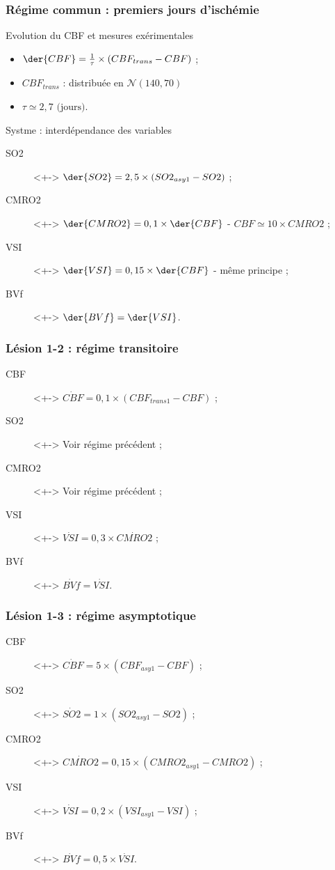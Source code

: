 \begin{frame}
\frametitle{R\'egime commun : premiers jours d'isch\'emie}
\begin{block}{Evolution du CBF et mesures ex\'erimentales}
\begin{itemize}
\item<+-> $\der{CBF}=\frac{1}{\tau}\times \left(CBF_{trans}-CBF\right)$ ;
\item<+-> $CBF_{trans}$ : distribu\'ee en $\mathcal{N}(140,70)$
\item<+-> $\tau \simeq 2,7 \text{ (jours)}$.
\end{itemize}
\end{block}

\begin{block}{Systme : interd\'ependance des variables}
\begin{description}
\item[SO2]<+-> $\der{SO2}=2,5\times (SO2_{asy1}-SO2)$ ;
\item[CMRO2]<+-> $\der{CMRO2}=0,1\times \der{CBF}$ - $CBF\simeq 10\times CMRO2$ ;
\item[VSI]<+-> $\der{VSI}=0,15\times\der{CBF}$ - m\^eme principe ;
\item[BVf]<+-> $\der{BVf}=\der{VSI}$.
\end{description}
\end{block}
\end{frame}

\begin{frame}
\frametitle{L\'esion 1-2 : r\'egime transitoire}
\begin{description}
\item[CBF]<+-> $\dot{CBF}=0, 1\times \left(CBF_{trans1}-CBF\right)$ ;
\item[SO2]<+-> Voir r\'egime pr\'ec\'edent ;
\item[CMRO2]<+-> Voir r\'egime pr\'ec\'edent ;
\item[VSI]<+-> $\dot{VSI}=0,3\times\dot{CMRO2}$ ;
\item[BVf]<+-> $\dot{BVf}=\dot{VSI}$.
\end{description}
\end{frame}

\begin{frame}
\frametitle{L\'esion 1-3 : r\'egime asymptotique}
\begin{description}
\item[CBF]<+-> $\dot{CBF}=5\times\left(CBF_{asy1}-CBF\right)$ ;
\item[SO2]<+-> $\dot{SO2}=1\times\left(SO2_{asy1}-SO2\right)$ ;
\item[CMRO2]<+-> $\dot{CMRO2}=0,15\times\left(CMRO2_{asy1}-CMRO2\right)$ ;
\item[VSI]<+-> $\dot{VSI}=0,2\times (VSI_{asy1}-VSI)$ ;
\item[BVf]<+-> $\dot{BVf}=0,5\times\dot{VSI}$.
\end{description}
\end{frame}

